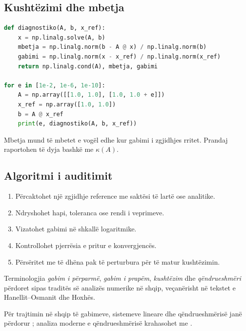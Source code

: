 \documentclass[11pt,oneside,openany]{book}
\begin{document}
\subsection{Kushtëzimi dhe mbetja}
\begin{lstlisting}[language=Python,caption={Krahasimi i gabimit me mbetjen.}]
def diagnostiko(A, b, x_ref):
    x = np.linalg.solve(A, b)
    mbetja = np.linalg.norm(b - A @ x) / np.linalg.norm(b)
    gabimi = np.linalg.norm(x - x_ref) / np.linalg.norm(x_ref)
    return np.linalg.cond(A), mbetja, gabimi

for e in [1e-2, 1e-6, 1e-10]:
    A = np.array([[1.0, 1.0], [1.0, 1.0 + e]])
    x_ref = np.array([1.0, 1.0])
    b = A @ x_ref
    print(e, diagnostiko(A, b, x_ref))
\end{lstlisting}
Mbetja mund të mbetet e vogël edhe kur gabimi i zgjidhjes rritet. Prandaj raportohen të dyja bashkë me $\kappa(A)$.

\subsection{Algoritmi i auditimit}
\begin{enumerate}
\item Përcaktohet një zgjidhje reference me saktësi të lartë ose analitike.
\item Ndryshohet hapi, toleranca ose rendi i veprimeve.
\item Vizatohet gabimi në shkallë logaritmike.
\item Kontrollohet pjerrësia e pritur e konvergjencës.
\item Përsëritet me të dhëna pak të perturbura për të matur kushtëzimin.
\end{enumerate}

Terminologjia \emph{gabim i përparmë}, \emph{gabim i prapëm}, \emph{kushtëzim} dhe \emph{qëndrueshmëri} përdoret sipas traditës së analizës numerike në shqip, veçanërisht në tekstet e Hanellit--Osmanit dhe Hoxhës.

Për trajtimin në shqip të gabimeve, sistemeve lineare dhe qëndrueshmërisë janë përdorur \cite{hanelli,hoxha,datja}; analiza moderne e qëndrueshmërisë krahasohet me \cite{higham}.



\end{document}

